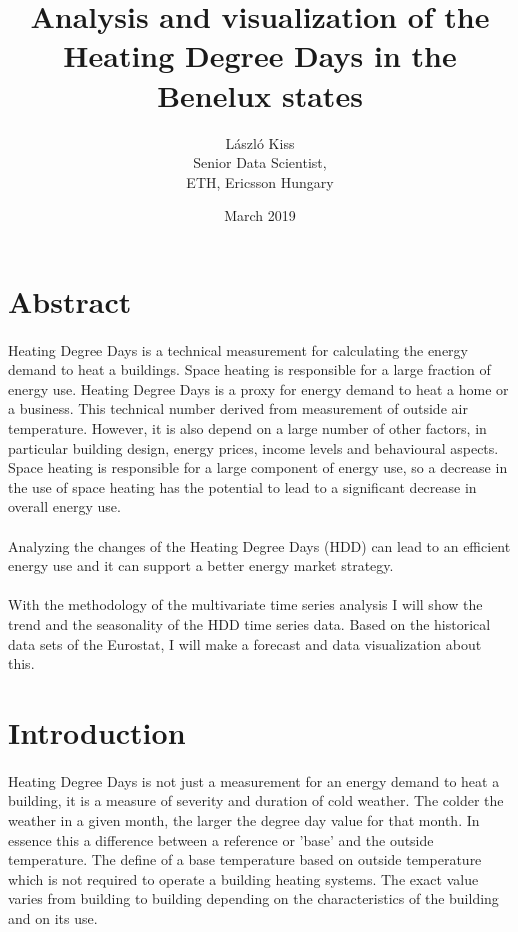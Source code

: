 \documentclass{article}
\title{Analysis and visualization of the Heating Degree Days in the Benelux states}
\author{László Kiss \\ Senior Data Scientist, \\ ETH, Ericsson Hungary }
\date{March 2019}
\begin{document}
\maketitle

\section*{Abstract}
\paragraph{}Heating Degree Days is a technical measurement for calculating the energy demand to heat a buildings. Space heating is responsible for a large fraction of energy use. Heating Degree Days is a proxy for energy demand to heat a home or a business. This technical number derived from measurement of outside air temperature. However, it is also depend on a large number of other factors, in particular building design, energy prices, income levels and behavioural aspects. Space heating is responsible for a large component of energy use, so a decrease in the use of space heating has the potential to lead to a significant decrease in overall energy use.
\paragraph{}Analyzing the changes of the Heating Degree Days (HDD) can lead to an efficient energy use and it can support a better energy market strategy.
\paragraph{}With the methodology of the multivariate time series analysis I will show the trend and the seasonality of the HDD time series data. Based on the historical data sets of the Eurostat, I will make a forecast and data visualization about this.

\section*{Introduction}

\paragraph{}Heating Degree Days is not just a measurement for an energy demand to heat a building, it is a measure of severity and duration of cold weather. The colder the weather in a given month, the larger the degree day value for that month. In essence this a difference between a reference or 'base' and the outside temperature. The define of a base temperature based on outside temperature which is not required to operate a building heating systems. The exact value varies from building to building depending on the characteristics of the building and on its use.
\end{document}
